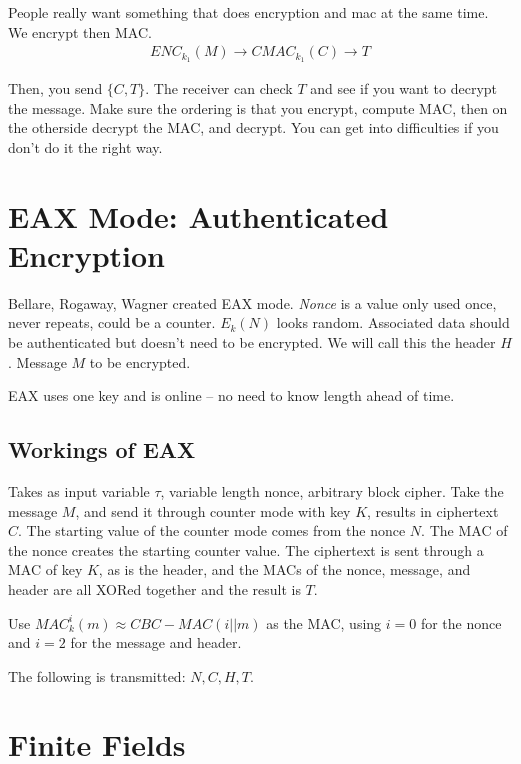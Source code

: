 \documentclass[psamsfonts]{amsart}
\begin{document}
People really want something that does encryption and mac at the same time. We encrypt then MAC.
\begin{eqnarray}
  ENC_{k_1}(M) \rightarrow C
  MAC_{k_1}(C) \rightarrow T
\end{eqnarray}

Then, you send $\{C, T\}$. The receiver can check $T$ and see if you want to decrypt the message. Make sure the ordering is that you encrypt, compute MAC, then on the otherside decrypt the MAC, and decrypt. You can get into difficulties if you don't do it the right way. 

\section{EAX Mode: Authenticated Encryption}

Bellare, Rogaway, Wagner created EAX mode. \emph{Nonce} is a value only used once, never repeats, could be a counter. $E_{k}(N)$ looks random. Associated data should be authenticated but doesn't need to be encrypted. We will call this the header $H$. Message $M$ to be encrypted.

EAX uses one key and is online -- no need to know length ahead of time. 

\subsection{Workings of EAX}

Takes as input variable $\tau$, variable length nonce, arbitrary block cipher. Take the message $M$, and send it through counter mode with key $K$, results in ciphertext $C$. The starting value of the counter mode comes from the nonce $N$. The MAC of the nonce creates the starting counter value. The ciphertext is sent through a MAC of key $K$, as is the header, and the MACs of the nonce, message, and header are all XORed together and the result is $T$. 

Use $MAC_{k}^i (m) \approx CBC-MAC(i || m)$ as the MAC, using $i=0$ for the nonce and $i =2$ for the message and header.

The following is transmitted: $N, C, H, T$.

\section{Finite Fields}
\end{document}

